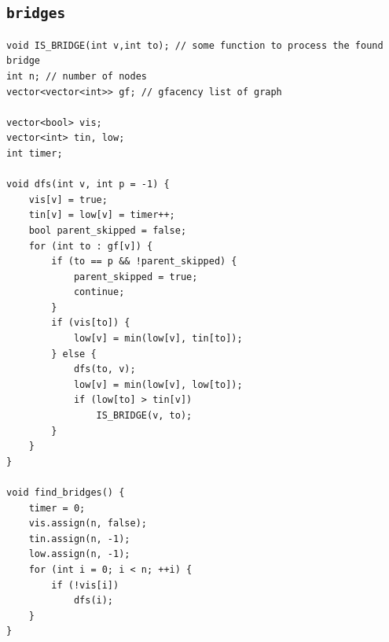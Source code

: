 \subsection{\texttt{bridges}}
\begin{lstlisting}
void IS_BRIDGE(int v,int to); // some function to process the found bridge
int n; // number of nodes
vector<vector<int>> gf; // gfacency list of graph

vector<bool> vis;
vector<int> tin, low;
int timer;

void dfs(int v, int p = -1) {
    vis[v] = true;
    tin[v] = low[v] = timer++;
    bool parent_skipped = false;
    for (int to : gf[v]) {
        if (to == p && !parent_skipped) {
            parent_skipped = true;
            continue;
        }
        if (vis[to]) {
            low[v] = min(low[v], tin[to]);
        } else {
            dfs(to, v);
            low[v] = min(low[v], low[to]);
            if (low[to] > tin[v])
                IS_BRIDGE(v, to);
        }
    }
}

void find_bridges() {
    timer = 0;
    vis.assign(n, false);
    tin.assign(n, -1);
    low.assign(n, -1);
    for (int i = 0; i < n; ++i) {
        if (!vis[i])
            dfs(i);
    }
}\end{lstlisting}

